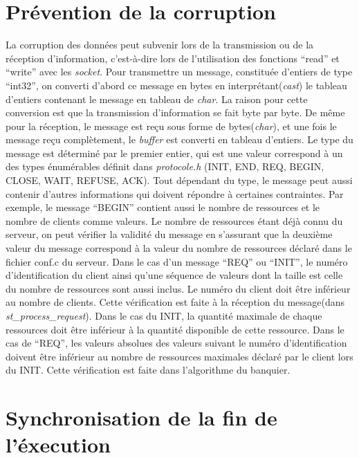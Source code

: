 \documentclass[letterpaper,12pt]{scrartcl}
\begin{document}
\section{Prévention de la corruption}
La corruption des données peut subvenir lors de la transmission ou de la réception d'information,
c'est-à-dire lors de l'utilisation des fonctions ``read'' et ``write'' avec les \emph{socket}.
Pour transmettre un message, constituée d'entiers de type ``int32'', on converti d'abord ce message en bytes en interprétant(\emph{cast})
le tableau d'entiers contenant le message en tableau de \emph{char}. La raison pour cette conversion est que la transmission d'information se fait byte par byte.
De même pour la réception, le message est reçu sous forme de bytes(\emph{char}), et une fois le message reçu complètement,
le \emph{buffer} est converti en tableau d'entiers.
Le type du message est déterminé par le premier entier, qui est une valeur correspond à un des types énumérables définit dans \emph{protocole.h}
(INIT, END, REQ, BEGIN, CLOSE, WAIT, REFUSE, ACK).
Tout dépendant du type, le message peut aussi contenir d'autres informations qui doivent répondre à certaines contraintes.
Par exemple, le message ``BEGIN'' contient aussi le nombre de ressources et le nombre de clients comme valeurs.
Le nombre de ressources étant déjà connu du serveur, on peut vérifier la validité du message en s'assurant que la deuxième valeur du message correspond à la valeur du nombre de ressources déclaré dans le fichier conf.c du serveur.
Dans le cas d'un message ``REQ'' ou ``INIT'', le numéro d'identification du client ainsi qu'une séquence de valeurs dont la taille est celle du nombre de ressources sont aussi inclus.
Le numéro du client doit être inférieur au nombre de clients. Cette vérification est faite à la réception du message(dans \emph{st\_process\_request}).
Dans le cas du INIT, la quantité maximale de chaque ressources doit être inférieur à la quantité disponible de cette ressource.
Dans le cas de ``REQ'', les valeurs absolues des valeurs suivant le numéro d'identification doivent être inférieur au nombre de ressources maximales déclaré par le client lors du INIT. Cette vérification est faite dans l'algorithme du banquier.

\section{Synchronisation de la fin de l'éxecution}
\end{document}
